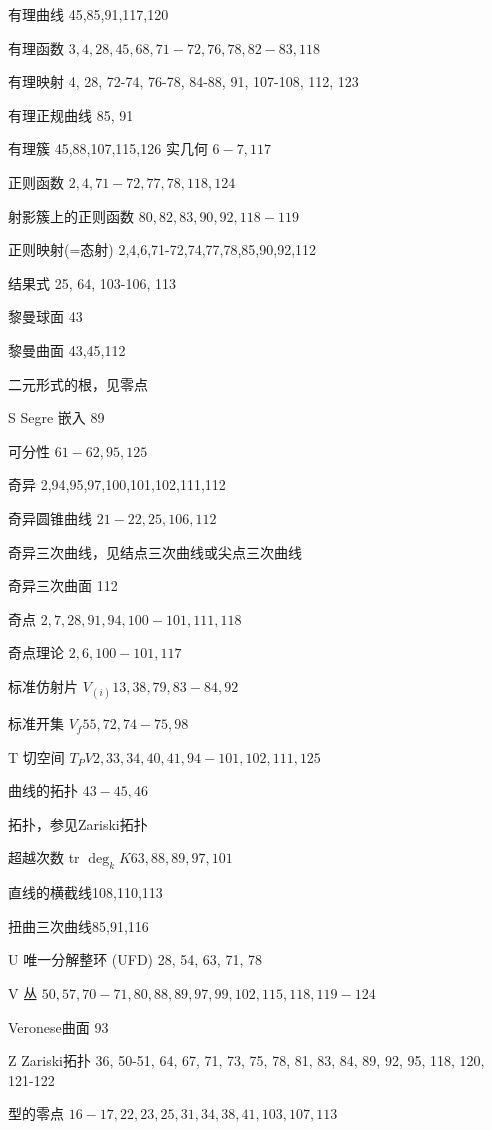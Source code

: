 有理曲线 45,85,91,117,120

有理函数 \(3,4,{28},{45},{68},{71} - {72},{76},{78},{82} - {83},{118}\)

有理映射 4, 28, 72-74, 76-78, 84-88, 91, 107-108, 112, 123

有理正规曲线 85, 91

有理簇 45,88,107,115,126 实几何 \(6 - 7,{117}\)

正则函数 \(2,4,{71} - {72},{77},{78},{118},{124}\)

射影簇上的正则函数 \({80},{82},{83},{90},{92},{118} - {119}\)

正则映射(=态射) 2,4,6,71-72,74,77,78,85,90,92,112

结果式 25, 64, 103-106, 113

黎曼球面 43

黎曼曲面 43,45,112

二元形式的根，见零点

S Segre 嵌入 89

可分性 \({61} - {62},{95},{125}\)

奇异 2,94,95,97,100,101,102,111,112

奇异圆锥曲线 \({21} - {22},{25},{106},{112}\)

奇异三次曲线，见结点三次曲线或尖点三次曲线

奇异三次曲面 112

奇点 \(2,7,{28},{91},{94},{100} - {101},{111},{118}\)

奇点理论 \(2,6,{100} - {101},{117}\)

标准仿射片 \({V}_{\left( i\right) }{13},{38},{79},{83} - {84},{92}\)

标准开集 \({V}_{f}{55},{72},{74} - {75},{98}\)

T 切空间 \({T}_{P}{V2},{33},{34},{40},{41},{94} - {101},{102},{111},{125}\)

曲线的拓扑 \({43} - {45},{46}\)

拓扑，参见Zariski拓扑

超越次数 tr \({\deg }_{k}{K63},{88},{89},{97},{101}\)

直线的横截线108,110,113

扭曲三次曲线85,91,116

U 唯一分解整环 (UFD) 28, 54, 63, 71, 78

V 丛 \({50},{57},{70} - {71},{80},{88},{89},{97},{99},{102},{115},{118},{119} - {124}\)

Veronese曲面 93

Z Zariski拓扑 36, 50-51, 64, 67, 71, 73, 75, 78, 81, 83, 84, 89, 92, 95, 118, 120, 121-122

型的零点 \({16} - {17},{22},{23},{25},{31},{34},{38},{41},{103},{107},{113}\)
